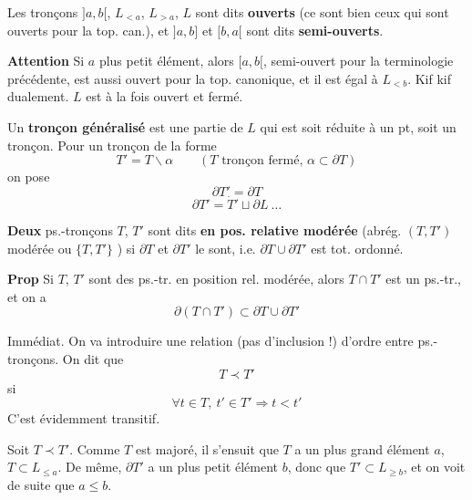 \documentclass[11pt,a4paper]{article}
\begin{document}
Les tronçons $]a,b[$, $L_{<a}$, $L_{>a}$, $L$ sont dits \textbf{ouverts}  (ce sont bien ceux qui sont ouverts pour la top. can.),  et $]a,b]$  et $[b,a[$ sont dits \textbf{semi-ouverts}.
\note{« $[b,a[$ » sur la page ; on attend $[a,b[$}

\textbf{Attention}  Si $a$ plus petit élément, alors $[a,b[$, \struck{\ill{}} semi-ouvert pour la terminologie précédente, est aussi ouvert pour la top. canonique, et il est égal à $L_{<b}$. Kif kif dualement. $L$ est à la fois ouvert et fermé.

Un \textbf{tronçon généralisé}  est une partie de $L$ qui est soit réduite à un pt, soit un tronçon. Pour un tronçon de la forme
\[
  T' = T \smallsetminus \alpha \qquad (T \text{ tronçon fermé, } \alpha \subset \partial T)
\]
\struck{\ill{}} on pose
\[
  \partial T' = \partial T
\]
\[
  \partial T' = \dot{T}' \sqcup \partial L \ \ldots
\]

 \textbf{Deux} ps.-tronçons $T$, $T'$ sont dits \textbf{en pos. relative modérée} (abrég. $(T,T')$ modérée ou $\{T,T'\}$ ) si $\partial T$ et $\partial T'$ le sont, i.e. $\partial T \cup \partial T'$ est tot. ordonné.

\textbf{Prop} Si $T$, $T'$ sont des ps.-tr. en position rel. modérée, alors $T \cap T'$ est  un ps.-tr., et on a
\[
  \partial (T \cap T') \subset \partial T \cup \partial T'
\]

Immédiat. On va introduire une relation (pas d'inclusion !) d'ordre entre ps.-tronçons. On dit que
\[
  T \prec T'
\]
si 
\[
  \forall t \in T,\ t' \in T' \Longrightarrow t < t'
\]
C'est évidemment transitif.

Soit $T \prec T'$. Comme $T$ est majoré, il s'ensuit que  $T$ a un plus grand élément $a$,  $T \subset L_{\leq a}$.  De même, $\partial T'$ a un plus petit élément $b$, donc que $T' \subset L_{\geq b}$, \struck{\ill{}} et on voit de suite que $a \leq b$.
\end{document}
